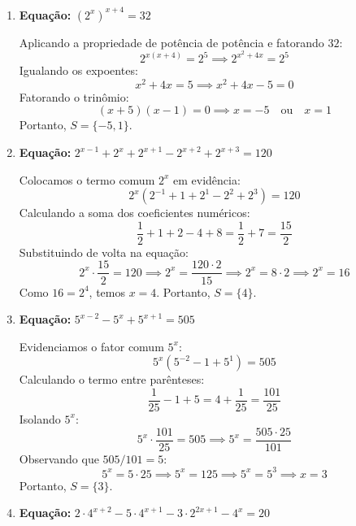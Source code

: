 \documentclass[12pt,a4paper]{report}
\begin{document}
\begin{enumerate}[label=\textbf{\arabic*.}]
	Convertendo para a base $3$:
	\[
	9^{3x+4} = (3^2)^{3x+4} = 3^{6x+8}
	\]
	\[
	27^{x+1} = (3^3)^{x+1} = 3^{3x+3}
	\]
	Multiplicando as potências do primeiro membro:
	\[
	3^{2x-1} \cdot 3^{6x+8} = 3^{(2x-1) + (6x+8)} = 3^{8x+7}
	\]
	Igualando os expoentes:
	\[
	8x + 7 = 3x + 3 \implies 5x = -4 \implies x = -\frac{4}{5}
	\]
	Portanto, $S = \left\{ -\dfrac{4}{5} \right\}$.
	
	\vspace{0.5cm}
	
	\item \textbf{Equação:} $(2^x)^{x+4} = 32$
	
	Aplicando a propriedade de potência de potência e fatorando $32$:
	\[
	2^{x(x+4)} = 2^5 \implies 2^{x^2+4x} = 2^5
	\]
	Igualando os expoentes:
	\[
	x^2 + 4x = 5 \implies x^2 + 4x - 5 = 0
	\]
	Fatorando o trinômio:
	\[
	(x + 5)(x - 1) = 0 \implies x = -5 \quad \text{ou} \quad x = 1
	\]
	Portanto, $S = \{-5, 1\}$.
	
	\vspace{0.5cm}
	
	\item \textbf{Equação:} $2^{x-1} + 2^x + 2^{x+1} - 2^{x+2} + 2^{x+3} = 120$
	
	Colocamos o termo comum $2^x$ em evidência:
	\[
	2^x \left( 2^{-1} + 1 + 2^1 - 2^2 + 2^3 \right) = 120
	\]
	Calculando a soma dos coeficientes numéricos:
	\[
	\frac{1}{2} + 1 + 2 - 4 + 8 = \frac{1}{2} + 7 = \frac{15}{2}
	\]
	Substituindo de volta na equação:
	\[
	2^x \cdot \frac{15}{2} = 120 \implies 2^x = \frac{120 \cdot 2}{15} \implies 2^x = 8 \cdot 2 \implies 2^x = 16
	\]
	Como $16 = 2^4$, temos $x = 4$. Portanto, $S = \{4\}$.
	
	\vspace{0.5cm}
	
	\item \textbf{Equação:} $5^{x-2} - 5^x + 5^{x+1} = 505$
	
	Evidenciamos o fator comum $5^x$:
	\[
	5^x \left( 5^{-2} - 1 + 5^1 \right) = 505
	\]
	Calculando o termo entre parênteses:
	\[
	\frac{1}{25} - 1 + 5 = 4 + \frac{1}{25} = \frac{101}{25}
	\]
	Isolando $5^x$:
	\[
	5^x \cdot \frac{101}{25} = 505 \implies 5^x = \frac{505 \cdot 25}{101}
	\]
	Observando que $505 / 101 = 5$:
	\[
	5^x = 5 \cdot 25 \implies 5^x = 125 \implies 5^x = 5^3 \implies x = 3
	\]
	Portanto, $S = \{3\}$.
	
	\vspace{0.5cm}
	
	\item \textbf{Equação:} $2 \cdot 4^{x+2} - 5 \cdot 4^{x+1} - 3 \cdot 2^{2x+1} - 4^x = 20$
	

\end{enumerate}
\end{document}
